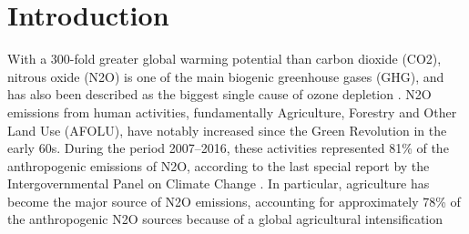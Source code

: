 \documentclass[12pt]{article}
\begin{document}
\section{Introduction}
With a 300-fold greater global warming potential than carbon dioxide (CO2), nitrous
oxide (N2O) is one of the main biogenic greenhouse gases (GHG), and has also been
described as the biggest single cause of ozone depletion \nocite{ravishankara2009nitrous}. N2O emissions from human
activities, fundamentally Agriculture, Forestry and Other Land Use (AFOLU), have notably
increased since the Green Revolution in the early 60s. During the period 2007–2016,
these activities represented 81\% of the anthropogenic emissions of N2O, according to the
last special report by the Intergovernmental Panel on Climate Change \nocite{shukla2019climate}. In particular,
agriculture has become the major source of N2O emissions, accounting for approximately
78\% of the anthropogenic N2O sources \nocite{shukla2019climate} because of a global agricultural intensification
\end{document}
